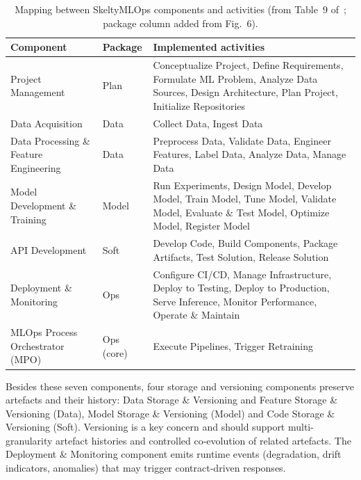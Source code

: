 \documentclass[11pt,a4paper]{article}
\begin{document}
\begin{table}[h]
\centering
\caption{Mapping between SkeltyMLOps components and activities (from Table~9 of~\cite{daoud2026}; package column added from Fig.~6).}\label{tab:components}
\small
\begin{tabularx}{\textwidth}{@{}L{3.6cm}L{1.6cm}X@{}}
\toprule
Component & Package & Implemented activities \\
\midrule
Project Management & Plan & Conceptualize Project, Define Requirements, Formulate ML Problem, Analyze Data Sources, Design Architecture, Plan Project, Initialize Repositories \\
Data Acquisition & Data & Collect Data, Ingest Data \\
Data Processing \& Feature Engineering & Data & Preprocess Data, Validate Data, Engineer Features, Label Data, Analyze Data, Manage Data \\
Model Development \& Training & Model & Run Experiments, Design Model, Develop Model, Train Model, Tune Model, Validate Model, Evaluate \& Test Model, Optimize Model, Register Model \\
API Development & Soft & Develop Code, Build Components, Package Artifacts, Test Solution, Release Solution \\
Deployment \& Monitoring & Ops & Configure CI/CD, Manage Infrastructure, Deploy to Testing, Deploy to Production, Serve Inference, Monitor Performance, Operate \& Maintain \\
MLOps Process Orchestrator (MPO) & Ops (core) & Execute Pipelines, Trigger Retraining \\
\bottomrule
\end{tabularx}
\end{table}

Besides these seven components, four storage and versioning components preserve artefacts and their history: Data Storage \& Versioning and Feature Storage \& Versioning (Data), Model Storage \& Versioning (Model) and Code Storage \& Versioning (Soft). Versioning is a key concern and should support multi-granularity artefact histories and controlled co-evolution of related artefacts. The Deployment \& Monitoring component emits runtime events (degradation, drift indicators, anomalies) that may trigger contract-driven responses.
\end{document}
